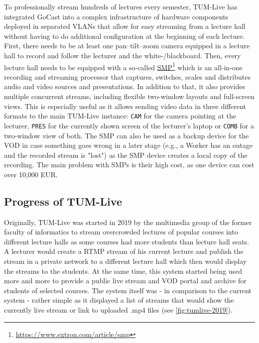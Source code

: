 To professionally stream hundreds of lectures every semester, TUM-Live has integrated GoCast into a complex infrastructure of hardware components deployed in separated VLANs that allow for easy streaming from a lecture hall without having to do additional configuration at the beginning of each lecture. 
First, there needs to be at least one pan–tilt–zoom camera equipped in a lecture hall to record and follow the lecturer and the white-/blackboard.
Then, every lecture hall needs to be equipped with a so-called \href{https://www.extron.com/article/smp}{\ac{SMP}}\footnote{\url{https://www.extron.com/article/smp}} which is an all-in-one recording and streaming processor that captures, switches, scales and distributes audio and video sources and presentations. In addition to that, it also provides multiple concurrent streams, including flexible two-window layouts and full-screen views. This is especially useful as it allows sending video data in three different formats to the main TUM-Live instance: \texttt{CAM} for the camera pointing at the lecturer, \texttt{PRES} for the currently shown screen of the lecturer's laptop or \texttt{COMB} for a two-window view of both. The \ac{SMP} can also be used as a backup device for the \ac{VOD} in case something goes wrong in a later stage (e.g., a Worker has an outage and the recorded stream is "lost") as the \ac{SMP} device creates a local copy of the recording. The main problem with \ac{SMP}s is their high cost, as one device can cost over 10,000 EUR.

\subsection{Progress of TUM-Live}

Originally, TUM-Live was started in 2019 by the multimedia group of the former faculty of informatics to stream overcrowded lectures of popular courses into different lecture halls as some courses had more students than lecture hall seats. A lecturer would create a \ac{RTMP} stream of his current lecture and publish the stream in a private network to a different lecture hall which then would display the streams to the students. At the same time, this system started being used more and more to provide a public live stream and \ac{VOD} portal and archive for students of selected courses. The system itself was - in comparison to the current system - rather simple as it displayed a list of streams that would show the currently live stream or link to uploaded .mp4 files (see \autoref{fig:tumlive-2019}).

